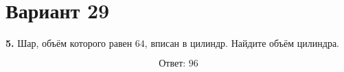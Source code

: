 \documentclass[12pt,a4paper]{article}
\begin{document}
\section*{Вариант 29}

\textbf{5.} Шар, объём которого равен \(64\), вписан в цилиндр.
Найдите объём цилиндра.

\begin{center}
\end{center}

\[
\boxed{\text{Ответ: }96}
\]
\end{document}

